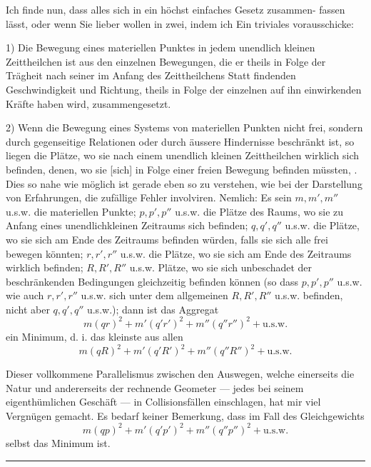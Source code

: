 Ich finde nun, dass alles sich in ein höchst einfaches Gesetz zusammen-\clearpage{}
\noindent fassen lässt, oder wenn Sie lieber wollen in zwei, indem ich Ein triviales
vorausschicke:
\par\noindent\hspace*{\parindent}1) Die Bewegung eines  materiellen Punktes in jedem unendlich
kleinen Zeittheilchen ist aus den einzelnen Bewegungen, die er theils in Folge
der Trägheit nach seiner im Anfang des Zeittheilchens Statt findenden Geschwindigkeit
und Richtung, theils in Folge der einzelnen auf ihn einwirkenden
Kräfte haben wird, zusammengesetzt.
\par\noindent\hspace*{\parindent}2) Wenn die Bewegung eines Systems von materiellen Punkten nicht
frei, sondern durch gegenseitige Relationen oder durch äussere Hindernisse
beschränkt ist, so liegen die Plätze, wo sie nach einem unendlich kleinen
Zeittheilchen wirklich sich befinden, denen, wo sie [sich] in Folge einer freien
Bewegung befinden müssten, . Dies so nahe wie
möglich ist gerade eben so zu verstehen, wie bei der Darstellung von Erfahrungen,
die zufällige Fehler involviren. Nemlich: Es sein \(m,m',m''\) u.s.w.
die materiellen Punkte; \(p,p',p''\) u.s.w. die Plätze des Raums, wo sie zu Anfang
eines unendlichkleinen Zeitraums sich befinden; \(q,q',q''\) u.s.w. die Plätze,
wo sie sich am Ende des Zeitraums befinden würden, falls sie sich alle frei
bewegen könnten; \(r,r',r''\) u.s.w. die Plätze, wo sie sich am Ende des Zeitraums
wirklich befinden; \(R,R',R''\) u.s.w.  Plätze, wo sie sich
unbeschadet der beschränkenden Bedingungen gleichzeitig befinden können
(so dass \(p,p',p''\) u.s.w. wie auch \(r,r',r''\) u.s.w. sich unter dem allgemeinen
\(R,R',R''\) u.s.w. befinden, nicht aber \(q,q',q''\) u.s.w.); dann ist das Aggregat
\[
 m(qr)^2+m'(q'r')^2+m''(q''r'')^2+\text{u.s.w.}
\]
\noindent ein Minimum, d. i. das kleinste aus allen
\[
 m(qR)^2+m'(q'R')^2+m''(q''R'')^2+\text{u.s.w.}
\]

Dieser vollkommene Parallelismus zwischen den Auswegen, welche einerseits
die Natur und andererseits der rechnende Geometer — jedes bei seinem
eigenthümlichen Geschäft — in Collisionsfällen einschlagen, hat mir viel Vergnügen
gemacht. Es bedarf keiner Bemerkung, dass im Fall des Gleichgewichts
\[
 m(qp)^2+m'(q'p')^2+m''(q''p'')^2+\text{u.s.w.}
\]
\noindent selbst das Minimum ist.
\par\noindent{}
\begin{center}\rule{.25\textwidth}{.35pt}\end{center}
\clearpage\endgroup
